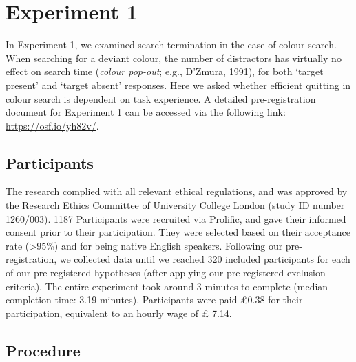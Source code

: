 \documentclass[12pt,twoside]{reedthesis}
\begin{document}
\hypertarget{experiment-1}{%
\section{Experiment 1}\label{experiment-1}}

In Experiment 1, we examined search termination in the case of colour search. When searching for a deviant colour, the number of distractors has virtually no effect on search time (\emph{colour pop-out}; e.g., D'Zmura, 1991), for both `target present' and `target absent' responses. Here we asked whether efficient quitting in colour search is dependent on task experience. A detailed pre-registration document for Experiment 1 can be accessed via the following link: \url{https://osf.io/yh82v/}.

\hypertarget{participants}{%
\subsection{Participants}\label{participants}}

The research complied with all relevant ethical regulations, and was approved by the Research Ethics Committee of University College London (study ID number 1260/003). 1187 Participants were recruited via Prolific, and gave their informed consent prior to their participation. They were selected based on their acceptance rate (\textgreater95\%) and for being native English speakers. Following our pre-registration, we collected data until we reached 320 included participants for each of our pre-registered hypotheses (after applying our pre-registered exclusion criteria). The entire experiment took around 3 minutes to complete (median completion time: 3.19 minutes). Participants were paid £0.38 for their participation, equivalent to an hourly wage of £ 7.14.

\hypertarget{procedure}{%
\subsection{Procedure}\label{procedure}}
\end{document}

